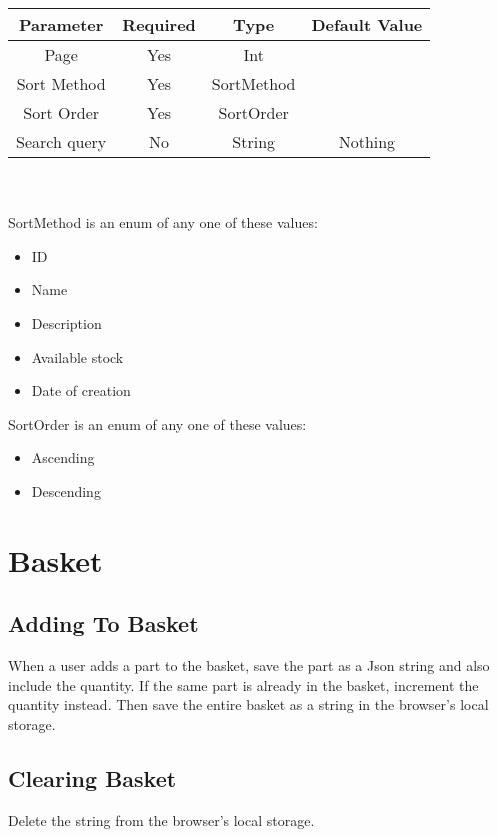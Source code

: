 \documentclass[12pt, letterpaper]{article}
\begin{document}
\begin{tabular}{cccc}
    \toprule
    \textbf{Parameter} & \textbf{Required} & \textbf{Type} & \textbf{Default Value} \\
    \midrule
    Page & Yes & Int \\
    \midrule
    Sort Method & Yes & SortMethod \\
    \midrule
    Sort Order & Yes & SortOrder \\
    \midrule
    Search query & No & String & Nothing \\
    \bottomrule
\end{tabular}
\\\\
SortMethod is an enum of any one of these values:

\begin{itemize}
    \item ID
    \item Name
    \item Description
    \item Available stock
    \item Date of creation
\end{itemize}

SortOrder is an enum of any one of these values:

\begin{itemize}
    \item Ascending
    \item Descending
\end{itemize}

\section{Basket}

\subsection{Adding To Basket}

When a user adds a part to the basket, save the part as a Json string and also include the quantity. If the same part is already in the basket, increment the quantity instead. Then save the entire basket as a string in the browser's local storage.

\subsection{Clearing Basket}

Delete the string from the browser's local storage.
\end{document}
